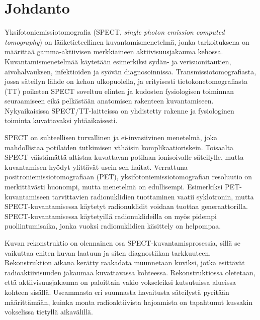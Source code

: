 \section{Johdanto}
Yksifotoniemissiotomografia (SPECT, \textit{single photon emission computed tomography}) on lääketieteellinen kuvantamismenetelmä, jonka tarkoituksena on määrittää gamma-aktiivisen merkkiaineen aktiivisuusjakauma kehossa\cite{bruyant_analytic_2002}. Kuvantamismenetelmää käytetään esimerkiksi sydän- ja verisuonitautien, aivohalvauksen, infektioiden ja syövän diagnosoinnissa.\cite{cherry_single_2012, van_audenhaege_review_2015, crisan_radiopharmaceuticals_2022, ljungberg_spectct_2018} Transmissiotomografiasta, jossa säteilyn lähde on kehon ulkopuolella\cite{bercovich_medical_2018}, ja erityisesti tietokonetomografiasta (TT) poiketen SPECT soveltuu elinten ja kudosten fysiologisen toiminnan seuraamiseen eikä pelkästään anatomisen rakenteen kuvantamiseen\cite{bercovich_medical_2018, crisan_radiopharmaceuticals_2022, cherry_single_2012}. Nykyaikaisissa SPECT/TT-laitteissa on yhdistetty rakenne ja fysiologinen toiminta kuvattavaksi yhtäaikaisesti\cite{hutton_origins_2014, cherry_single_2012, bercovich_medical_2018, ljungberg_spectct_2018}.

SPECT on suhteellisen turvallinen ja ei-invasiivinen menetelmä, joka mahdollistaa potilaiden tutkimisen vähäisin komplikaatioriskein. Toisaalta SPECT väistämättä altistaa kuvattavan potilaan ionisoivalle säteilylle, mutta kuvantamisen hyödyt ylittävät usein sen haitat.\cite{ljungberg_spectct_2018} Verrattuna positroniemissiotomografiaan (PET), yksifotoniemissiotomografian resoluutio on merkittävästi huonompi, mutta menetelmä on edullisempi\cite{crisan_radiopharmaceuticals_2022, cherry_single_2012}. Esimerkiksi PET-kuvantamiseen tarvittavien radionuklidien tuottaminen vaatii syklotronin, mutta SPECT-kuvantamisessa käytetyt radionuklidit voidaan tuottaa generaattorilla. SPECT-kuvantamisessa käytetyillä radionuklideilla on myös pidempi puoliintumisaika, jonka vuoksi radionuklidien käsittely on helpompaa.\cite{crisan_radiopharmaceuticals_2022}

Kuvan rekonstruktio on olennainen osa SPECT-kuvantamisprosessia, sillä se vaikuttaa eniten kuvan laatuun ja siten diagnostiikan tarkkuuteen\cite{slomka_novel_2022}. Rekonstruktion aikana kerätty raakadata muunnetaan kuviksi, jotka esittävät radioaktiivisuuden jakaumaa kuvattavassa kohteessa. Rekonstruktiossa oletetaan, että aktiivisuusjakauma on paloittain vakio vokseleiksi kutsutuissa alueissa kohteen sisällä. Useammasta eri suunnasta havaitusta säteilystä pyritään määrittämään, kuinka monta radioaktiivista hajoamista on tapahtunut kussakin vokselissa tietyllä aikavälillä.\cite{bruyant_analytic_2002, slomka_novel_2022}

